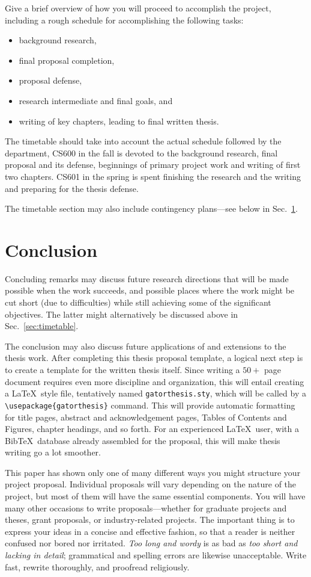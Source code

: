 Give a brief overview of how you will proceed to accomplish the project,
including a rough schedule for accomplishing the following tasks:
\begin{itemize}
\item background research,
\item final proposal completion,
\item proposal defense,
\item research intermediate and final goals, and
\item writing of key chapters, leading to final written thesis.
\end{itemize}
The timetable should take into account the actual schedule followed by
the department, CS600 in the fall is devoted to the background research,
final proposal and its defense, beginnings of primary project work and
writing of first two chapters.  CS601 in the spring is spent finishing
the research and the writing and preparing for the thesis defense.

The timetable section may also include contingency plans---see below in
Sec.~\ref{sec:conclusion}.

\section{Conclusion}\label{sec:conclusion}

Concluding remarks may discuss future research directions that will
be made possible when the work succeeds, and possible places where
the work might be cut short (due to difficulties) while still achieving
some of the significant objectives.  The latter might alternatively
be discussed above in Sec.~\ref{sec:timetable}.

The conclusion may also discuss future applications of and extensions
to the thesis work.  After completing this thesis proposal template,
a logical next step is to create a template for the written thesis itself.
Since writing a $50+$ page document requires even more discipline and
organization, this will entail creating a \LaTeX\ style file, tentatively
named \verb+gatorthesis.sty+, which will be called by a
\verb+\usepackage{gatorthesis}+ command.  This will provide automatic
formatting for title pages, abstract and acknowledgement pages, Tables
of Contents and Figures, chapter headings, and so forth.  For
an experienced \LaTeX\ user, with a Bib\TeX\ database already assembled
for the proposal, this will make thesis writing go a lot smoother.

This paper has shown only one of many different ways you might structure
your project proposal.  Individual proposals will vary depending on the
nature of the project, but most of them will have the same essential
components.  You will have many other occasions to write
proposals---whether for graduate projects and theses, grant proposals,
or industry-related projects.  The important thing is to express
your ideas in a concise and effective fashion, so that a reader is
neither confused nor bored nor irritated.  \emph{Too long and wordy}
is as bad as \emph{too short and lacking in detail}; grammatical
and spelling errors are likewise unacceptable.  Write fast, rewrite
thoroughly, and proofread religiously.
